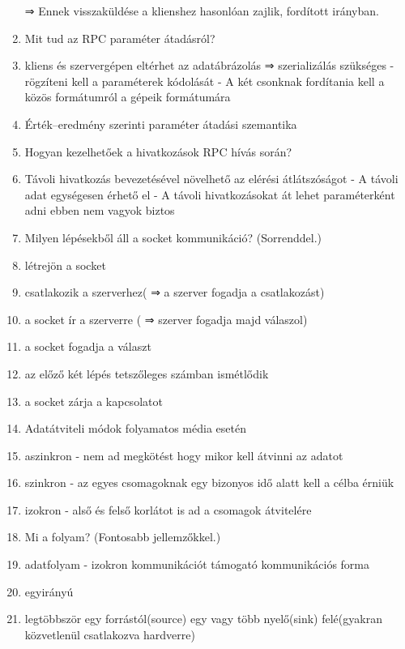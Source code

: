 \documentclass[twoside, a4paper, 12pt]{article}
\begin{document}
\begin{enumerate}
                ⇒ Ennek visszaküldése a klienshez hasonlóan zajlik, fordított irányban.
            \item  Mit tud az RPC paraméter átadásról?
            \item kliens és szervergépen eltérhet az adatábrázolás ⇒ szerializálás szükséges
                - rögzíteni kell a paraméterek kódolását
                - A két csonknak fordítania kell a közös formátumról a gépeik formátumára
            \item Érték–eredmény szerinti paraméter átadási szemantika
            \item  Hogyan kezelhetőek a hivatkozások RPC hívás során?
            \item Távoli hivatkozás bevezetésével növelhető az elérési átlátszóságot
                - A távoli adat egységesen érhető el
                - A távoli hivatkozásokat át lehet paraméterként adni
                ebben nem vagyok biztos
            \item  Milyen lépésekből áll a socket kommunikáció? (Sorrenddel.)
            \item létrejön a socket
            \item csatlakozik a szerverhez( ⇒ a szerver fogadja a csatlakozást)
            \item a socket ír a szerverre ( ⇒ szerver fogadja majd válaszol)
            \item a socket fogadja a választ
            \item az előző két lépés tetszőleges számban ismétlődik
            \item a socket zárja a kapcsolatot
            \item  Adatátviteli módok folyamatos média esetén
            \item aszinkron
                - nem ad megkötést hogy mikor kell átvinni az adatot
            \item szinkron
                - az egyes csomagoknak egy bizonyos idő alatt kell a célba érniük
            \item izokron 
                - alső és felső korlátot is ad a csomagok átvitelére
            \item  Mi a folyam? (Fontosabb jellemzőkkel.)
            \item adatfolyam
                - izokron kommunikációt támogató kommunikációs forma
            \item egyirányú
            \item legtöbbször egy forrástól(source) egy vagy több nyelő(sink) felé(gyakran közvetlenül csatlakozva hardverre)

\end{enumerate}
\end{document}
